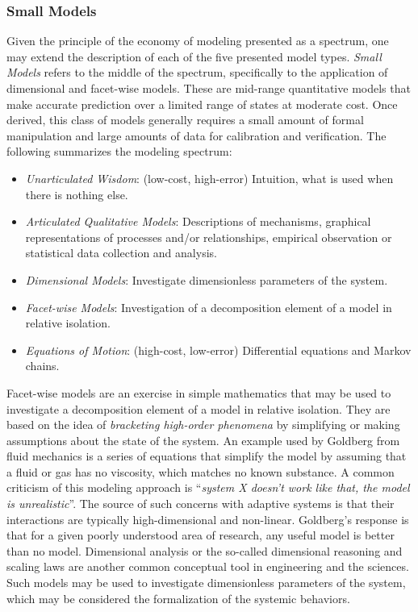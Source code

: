 \documentclass[a4paper, 11pt]{article}
\begin{document}
\subsubsection{Small Models} 
Given the principle of the economy of modeling presented as a spectrum, one may extend the description of each of the five presented model types. \emph{Small Models} refers to the middle of the spectrum, specifically to the application of dimensional and facet-wise models. These are mid-range quantitative models that make accurate prediction over a limited range of states at moderate cost. Once derived, this class of models generally requires a small amount of formal manipulation and large amounts of data for calibration and verification. The following summarizes the modeling spectrum:

\begin{itemize}
	\item \emph{Unarticulated Wisdom}: (low-cost, high-error) Intuition, what is used when there is nothing else.
	\item \emph{Articulated Qualitative Models}: Descriptions of mechanisms, graphical representations of processes and/or relationships, empirical observation or statistical data collection and analysis.
	\item \emph{Dimensional Models}: Investigate dimensionless parameters of the system.
	\item \emph{Facet-wise Models}: Investigation of a decomposition element of a model in relative isolation.
	\item \emph{Equations of Motion}: (high-cost, low-error) Differential equations and Markov chains.
\end{itemize}

Facet-wise models are an exercise in simple mathematics that may be used to investigate a decomposition element of a model in relative isolation. They are based on the idea of \emph{bracketing high-order phenomena} by simplifying or making assumptions about the state of the system. An example used by Goldberg from fluid mechanics is a series of equations that simplify the model by assuming that a fluid or gas has no viscosity, which matches no known substance. A common criticism of this modeling approach is ``\emph{system X doesn't work like that, the model is unrealistic}''. The source of such concerns with adaptive systems is that their interactions are typically high-dimensional and non-linear. Goldberg's response is that for a given poorly understood area of research, any useful model is better than no model. Dimensional analysis or the so-called dimensional reasoning and scaling laws are another common conceptual tool in engineering and the sciences. Such models may be used to investigate dimensionless parameters of the system, which may be considered the formalization of the systemic behaviors.
\end{document}
